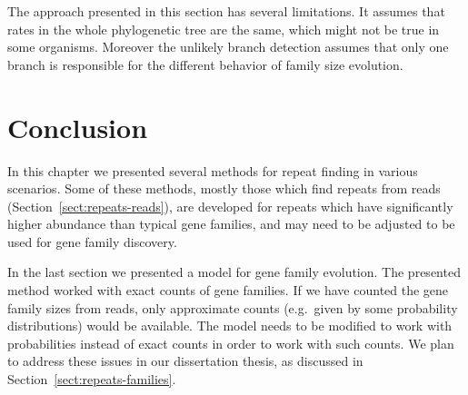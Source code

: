 The approach presented in this section has several limitations. It assumes that rates in the whole phylogenetic tree are the same, which might not be true in some organisms. Moreover the unlikely branch detection assumes that only one branch is responsible for the different behavior of family size evolution.

\section{Conclusion}

In this chapter we presented several methods for repeat finding in various scenarios.
Some of these methods, mostly those which find repeats from reads (Section~\ref{sect:repeats-reads}), are developed for repeats which have significantly higher abundance than typical gene families, and may need to be adjusted to be used for gene family discovery.

In the last section we presented a model for gene family evolution. The presented method worked with exact counts of gene families. If we have counted the gene family sizes from reads, only approximate counts (e.g.\ given by some probability distributions) would be available. The model needs to be modified to work with probabilities instead of exact counts in order to work with such counts.
We plan to address these issues in our dissertation thesis, as discussed in Section~\ref{sect:repeats-families}.
